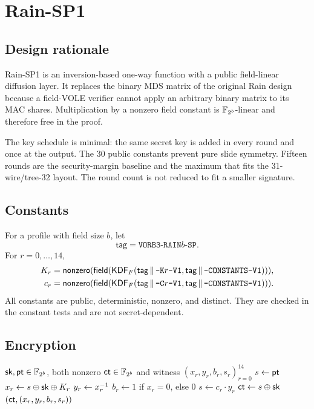 \documentclass[11pt,a4paper]{article}
\begin{document}
\section{Rain-SP1}
\label{sec:rain}

\subsection{Design rationale}

Rain-SP1 is an inversion-based one-way function with a public field-linear
diffusion layer. It replaces the binary MDS matrix of the original Rain design
because a field-VOLE verifier cannot apply an arbitrary binary matrix to its
MAC shares. Multiplication by a nonzero field constant is $\mathbb{F}_{2^{b}}$-linear and
therefore free in the proof.

The key schedule is minimal: the same secret key is added in every round and
once at the output. The 30 public constants prevent pure slide symmetry.
Fifteen rounds are the security-margin baseline and the maximum that fits the
31-wire/tree-32 layout. The round count is not reduced to fit a smaller
signature.

\subsection{Constants}

For a profile with field size $b$, let
\[
\mathsf{tag}=\texttt{VORB3-RAIN}b\texttt{-SP}.
\]
For $r=0,\ldots,14$,
\begin{align}
K_r&=\mathsf{nonzero}(\mathsf{field}(\mathsf{KDF}_F(
  \mathsf{tag}\,\|\,\texttt{-K}r\texttt{-V1},
  \mathsf{tag}\,\|\,\texttt{-CONSTANTS-V1}))),\\
c_r&=\mathsf{nonzero}(\mathsf{field}(\mathsf{KDF}_F(
  \mathsf{tag}\,\|\,\texttt{-C}r\texttt{-V1},
  \mathsf{tag}\,\|\,\texttt{-CONSTANTS-V1}))).
\end{align}
All constants are public, deterministic, nonzero, and distinct. They are
checked in the constant tests and are not secret-dependent.

\subsection{Encryption}

\begin{algorithm}[ht]
\small
\caption{$\Rain(\sk,\pt)$}
\label{alg:rain}
\begin{algorithmic}[1]
\REQUIRE $\mathsf{sk},\mathsf{pt}\in\mathbb{F}_{2^{b}}$, both nonzero
\ENSURE $\mathsf{ct}\in\mathbb{F}_{2^{b}}$ and witness $(x_r,y_r,b_r,s_r)_{r=0}^{14}$
\STATE $s\gets\mathsf{pt}$
  \STATE $x_r\gets s\oplus\mathsf{sk}\oplus K_r$
  \STATE $y_r\gets x_r^{-1}$ 
  \STATE $b_r\gets 1$ if $x_r=0$, else $0$
  \STATE $s\gets c_r\cdot y_r$
\ENDFOR
\STATE $\mathsf{ct}\gets s\oplus\mathsf{sk}$
\RETURN $(\mathsf{ct},(x_r,y_r,b_r,s_r))$
\end{algorithmic}
\end{algorithm}
\end{document}
